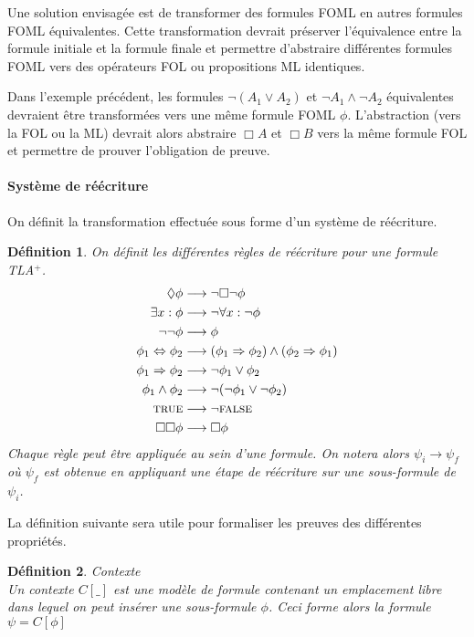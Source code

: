 \documentclass[12pt]{article}
\newcommand{\TRUE}{\textsc{true}}
\newcommand{\FALSE}{\textsc{false}}
\newtheorem{defin}{Définition}
\begin{document}
Une solution envisagée est de transformer des formules FOML en autres formules FOML équivalentes.
Cette transformation devrait préserver l'équivalence entre la formule initiale et la formule finale et permettre d'abstraire différentes formules FOML vers des opérateurs FOL ou propositions ML identiques.

Dans l'exemple précédent, les formules $\neg (A_1 \lor A_2)$ et $\neg A_1 \land \neg A_2$ équivalentes devraient être transformées vers une même formule FOML $\phi$.
L'abstraction (vers la FOL ou la ML) devrait alors abstraire $\Box A$ et $\Box B$ vers la même formule FOL et permettre de prouver l'obligation de preuve.


\paragraph{Système de réécriture}

On définit la transformation effectuée sous forme d'un système de réécriture.

\begin{defin}
  On définit les différentes règles de réécriture pour une formule TLA$^+$.
  \begin{align*}
    \Diamond \phi & \longrightarrow \neg \Box \neg \phi \\
    \exists x : \phi & \longrightarrow \neg \forall x : \neg \phi \\
    \neg \neg \phi & \longrightarrow \phi \\
    \phi_1 \Leftrightarrow \phi_2 & \longrightarrow (\phi_1 \Rightarrow \phi_2) \land (\phi_2 \Rightarrow \phi_1) \\
    \phi_1 \Rightarrow \phi_2 & \longrightarrow \neg \phi_1 \lor \phi_2 \\
    \phi_1 \land \phi_2 & \longrightarrow \neg(\neg \phi_1 \lor \neg \phi_2) \\
    \TRUE & \longrightarrow \neg \FALSE \\
    \Box \Box \phi & \longrightarrow \Box \phi \\
  \end{align*}
  Chaque règle peut être appliquée au sein d'une formule.
  On notera alors \( \psi_i \longrightarrow \psi_f \) où \(\psi_f\) est obtenue en appliquant une étape de réécriture sur une sous-formule de \(\psi_i\).
\end{defin}

La définition suivante sera utile pour formaliser les preuves des différentes propriétés.

\begin{defin} \emph{Contexte} \\
  Un contexte \( C[\_] \) est une modèle de formule contenant un emplacement libre dans lequel on peut insérer une sous-formule \( \phi \).
  Ceci forme alors la formule \( \psi = C[\phi] \)
\end{defin}
\end{document}
